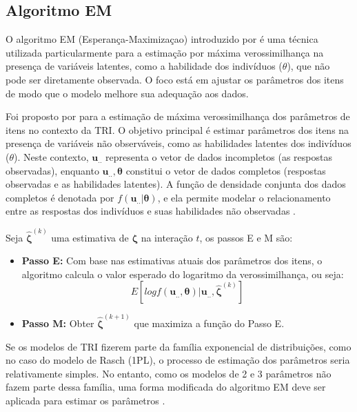 \subsection{Algoritmo EM}


O algoritmo EM (Esperança-Maximizaçao) introduzido por  é uma técnica utilizada particularmente para a estimação por máxima verossimilhança na presença de variáveis latentes, como a habilidade dos indivíduos ($\theta$), que não pode ser diretamente observada.  O foco está em ajustar os parâmetros dos itens de modo que o modelo melhore sua adequação aos dados.

Foi proposto por  para a estimação de máxima verossimilhança dos parâmetros de itens no contexto da TRI. O objetivo principal é estimar parâmetros dos itens na presença de variáveis não observáveis, como as habilidades latentes dos indivíduos ($\theta$). Neste contexto, $\boldsymbol{u}_{..}$ representa o vetor de dados incompletos (as respostas observadas), enquanto $\boldsymbol{u}_{..},\boldsymbol{\theta}$ constitui o vetor de dados completos (respostas observadas e as habilidades latentes). A função de densidade conjunta dos dados completos é denotada por $f(\boldsymbol{u}_{..}|\boldsymbol{\theta})$, e ela permite modelar o relacionamento entre as respostas dos indivíduos e suas habilidades não observadas \cite{de2000teoria}.

Seja $\boldsymbol{\hat{\zeta}}^{(k)}$ uma estimativa de $\boldsymbol{\zeta}$ na interação $t$, os passos E e M são:
\begin{itemize}
	\item[] \textbf{Passo E:} Com base nas estimativas atuais dos parâmetros dos itens, o algoritmo calcula o valor esperado do logaritmo da verossimilhança, ou seja:
	\[
	E\left[log f(\boldsymbol{u}_{..}, \boldsymbol{\theta}) | \boldsymbol{u}_{..}, \boldsymbol{\hat{\zeta}}^{(k)}\right] 
	\]
	
	\item[] \textbf{Passo M:} 	Obter $\boldsymbol{\hat{\zeta}}^{(k+1)}$ que maximiza a função do Passo E.
\end{itemize}

Se os modelos de TRI fizerem parte da família exponencial de distribuições, como no caso do modelo de Rasch (1PL), o processo de estimação dos parâmetros seria relativamente simples. No entanto, como os modelos de 2 e 3 parâmetros não fazem parte dessa família, uma forma modificada do algoritmo EM deve ser aplicada para estimar os parâmetros \cite{de2000teoria}.

